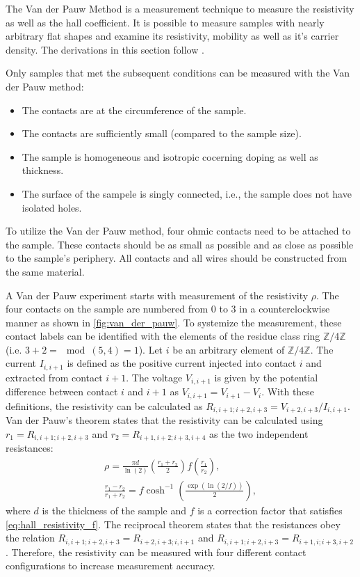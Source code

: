 The Van der Pauw Method is a measurement technique to measure the resistivity as well 
as the hall coefficient.
It is possible to measure samples with nearly arbitrary flat shapes and examine its 
resistivity, mobility as well as it's carrier density. 
The derivations in this section follow .

Only samples that met the subsequent conditions can be measured with the Van der Pauw 
method:
\begin{itemize}
	\item The contacts are at the circumference of the sample.
	\item The contacts are sufficiently small (compared to the sample size).
	\item The sample is homogeneous and isotropic cocerning doping as well as thickness.
	\item The surface of the sampele is singly connected, i.e., the sample does not
	have isolated holes.
\end{itemize}
To utilize the Van der Pauw method, four ohmic contacts need to be attached to the 
sample.
These contacts should be as small as possible and as close as possible to the sample's 
periphery. 
All contacts and all wires should be constructed from the same material. 

A Van der Pauw experiment starts with measurement of the resistivity $\rho$.
The four contacts on the sample are numbered from \num{0} to \num{3} in a 
counterclockwise manner as shown in \cref{fig:van_der_pauw}. 
To systemize the measurement, these contact labels can be identified with the 
elements of the residue class ring $\mathbb{Z}/4\mathbb{Z}$ (i.e. $3+2=\mod(5,4)=1$).
Let $i$ be an arbitrary element of $\mathbb{Z}/4\mathbb{Z}$.
The current $I_{i, i+1}$ is defined as the positive current injected into contact $i$ 
and extracted from contact $i+1$.
The voltage $V_{i, i+1}$ is given by the potential difference between contact $i$ and 
$i+1$ as $V_{i, i+1}=V_{i+1}-V_i$. 
With these definitions, the resistivity can be calculated as 
$R_{i, i+1; i+2, i+3}=V_{i+2, i+3} / {I_{i, i+1}}$. 
Van der Pauw's theorem states that the resistivity can be calculated using 
$r_1=R_{i, i+1; i+2, i+3}$ and $r_2=R_{i+1, i+2; i+3, i+4}$ as the two independent 
resistances:
\begin{align}
	\rho=\frac{\pi d}{\ln(2)} \left( \frac{r_1+r_2}{2} \right)f
	\left( \frac{r_1}{r_2} \right), \label{eq:hall_resistivity}\\
	\frac{r_1-r_2}{r_1+r_2}=f \cosh^{-1} \left( \frac{\exp(\ln(2 /f))}{2} \right),
	\label{eq:hall_resistivity_f}
\end{align}
where $d$ is the thickness of the sample and $f$ is a correction factor that satisfies 
\cref{eq:hall_resistivity_f}. 
The reciprocal theorem states that the resistances obey the relation 
$R_{i, i+1; i+2, i+3}=R_{i+2, i+3; i, i+1}$ and 
$R_{i, i+1;i+2, i+3}=R_{i+1, i; i+3, i+2}$.
Therefore, the resistivity can be measured with four different contact configurations to
increase measurement accuracy.

